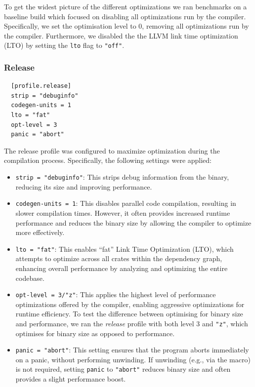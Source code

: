 \documentclass[twoside,11pt]{report}
\theoremstyle{definition}
\theoremstyle{plain}
\begin{document}
To get the widest picture of the different optimizations we ran benchmarks on a baseline build which focused on disabling all optimizations run by the compiler. Specifically, we set the optimisation level to 0, removing all optimizations run by the compiler. Furthermore, we disabled the the LLVM link time optimization (LTO) by setting the \texttt{lto} flag to \texttt{"off"}.

\subsubsection*{Release}
\begin{verbatim}
  [profile.release]
  strip = "debuginfo"
  codegen-units = 1  
  lto = "fat"        
  opt-level = 3      
  panic = "abort"
\end{verbatim}

The release profile was configured to maximize optimization during the compilation process. Specifically, the following settings were applied:

\begin{itemize}
  \item \texttt{strip = "debuginfo"}: This strips debug information from the binary, reducing its size and improving performance.

  \item \texttt{codegen-units = 1}: This disables parallel code compilation, resulting in slower compilation times. However, it often provides increased runtime performance and reduces the binary size by allowing the compiler to optimize more effectively.

  \item \texttt{lto = "fat"}: This enables ``fat'' Link Time Optimization (LTO), which attempts to optimize across all crates within the dependency graph, enhancing overall performance by analyzing and optimizing the entire codebase.

  \item \texttt{opt-level = 3/"z"}: This applies the highest level of performance optimizations offered by the compiler, enabling aggressive optimizations for runtime efficiency. To test the difference between optimising for binary size and performance, we ran the \textit{release} profile with both level 3 and \texttt{"z"}, which optimises for binary size as opposed to performance.


  \item \texttt{panic = "abort"}: This setting ensures that the program aborts immediately on a panic, without performing unwinding. If unwinding (e.g., via the  macro) is not required, setting \texttt{panic} to \texttt{"abort"} reduces binary size and often provides a slight performance boost.
\end{itemize}
\end{document}
